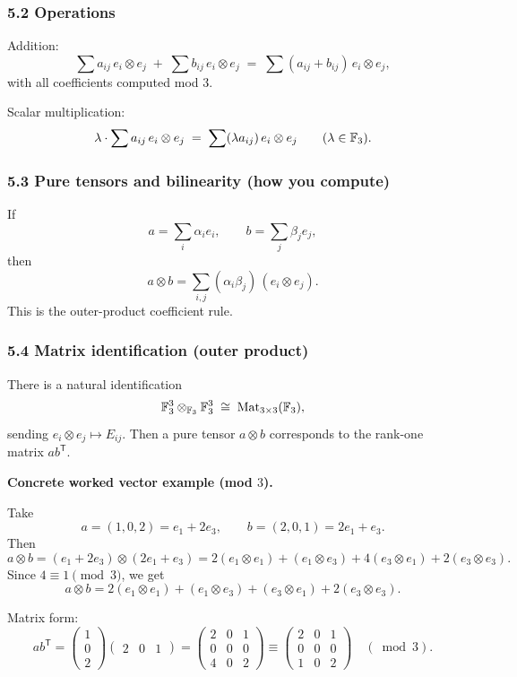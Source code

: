 \documentclass[12pt,a4paper]{article}
\newcommand{\Mat}{\mathrm{Mat}}
\theoremstyle{plain}
\theoremstyle{definition}      %
\begin{document}
	\subsubsection*{5.2 Operations}
	
	Addition:
	\[
	\sum a_{ij}\,e_i\otimes e_j \;+\; \sum b_{ij}\,e_i\otimes e_j
	\;=\; \sum (a_{ij}+b_{ij})\,e_i\otimes e_j,
	\]
	with all coefficients computed mod \(3\).
	
	Scalar multiplication:
	\[
	\lambda\cdot \sum a_{ij}\,e_i\otimes e_j
	\;=\; \sum (\lambda a_{ij})\,e_i\otimes e_j
	\qquad (\lambda\in \Bbb F_3).
	\]
	
	\subsubsection*{5.3 Pure tensors and bilinearity (how you compute)}
	
	If
	\[
	a=\sum_i \alpha_i e_i,
	\qquad
	b=\sum_j \beta_j e_j,
	\]
	then
	\[
	a\otimes b
	=
	\sum_{i,j} (\alpha_i\beta_j)\,(e_i\otimes e_j).
	\]
	This is the outer-product coefficient rule.
	
	\subsubsection*{5.4 Matrix identification (outer product)}
	
	There is a natural identification
	\[
	\Bbb F_3^3\otimes_{\Bbb F_3}\Bbb F_3^3
	\;\cong\;
	\Mat_{3\times 3}(\Bbb F_3),
	\]
	sending \(e_i\otimes e_j\mapsto E_{ij}\).
	Then a pure tensor \(a\otimes b\) corresponds to the rank-one matrix \(ab^{\mathsf T}\).
	
	\medskip
	\textbf{Concrete worked vector example (mod \(3\)).}
	
	Take
	\[
	a=(1,0,2)=e_1+2e_3,
	\qquad
	b=(2,0,1)=2e_1+e_3.
	\]
	Then
	\[
	a\otimes b
	=
	(e_1+2e_3)\otimes(2e_1+e_3)
	=
	2(e_1\otimes e_1)
	+
	(e_1\otimes e_3)
	+
	4(e_3\otimes e_1)
	+
	2(e_3\otimes e_3).
	\]
	Since \(4\equiv 1\pmod 3\), we get
	\[
	a\otimes b
	=
	2(e_1\otimes e_1)
	+
	(e_1\otimes e_3)
	+
	(e_3\otimes e_1)
	+
	2(e_3\otimes e_3).
	\]
	
	Matrix form:
	\[
	ab^{\mathsf T}
	=
	\begin{pmatrix}1\\0\\2\end{pmatrix}
	\begin{pmatrix}2&0&1\end{pmatrix}
	=
	\begin{pmatrix}
		2&0&1\\
		0&0&0\\
		4&0&2
	\end{pmatrix}
	\equiv
	\begin{pmatrix}
		2&0&1\\
		0&0&0\\
		1&0&2
	\end{pmatrix}
	\quad(\bmod 3).
	\]
	
\end{document}
